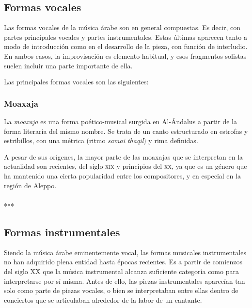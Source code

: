 \subsection{Formas vocales}

    Las formas vocales de la música árabe son en general compuestas. Es decir, con partes principales vocales y partes instrumentales. Estas últimas aparecen tanto a modo de introducción como en el desarrollo de la pieza, con función de interludio. En ambos casos, la improvisación es elemento habitual, y esos fragmentos solistas suelen incluir una parte importante de ella.

    Las principales formas vocales son las siguientes:

    \subsubsection{Moaxaja}

    La \emph{moaxaja} es una forma poético-musical surgida en Al-Ándalus a partir de la forma literaria del mismo nombre. Se trata de un canto estructurado en estrofas y estribillos, con una métrica (ritmo \emph{samai thaqil}) y rima definidas. 

    A pesar de sus orígenes, la mayor parte de las moaxajas que se interpretan en la actualidad son recientes, del siglo \textsc{xix} y principios del \textsc{xx}, ya que es un género que ha mantenido una cierta popularidad entre los compositores, y en especial en la región de Aleppo.


    \subsubsection{}
    ***

\subsection{Formas instrumentales}

    Siendo la música árabe eminentemente vocal, las formas musicales instrumentales no han adquirido plena entidad hasta épocas recientes. Es a partir de comienzos del siglo \textsc{XX} que la música instrumental alcanza suficiente categoría como para interpretarse por sí misma. Antes de ello, las piezas instrumentales aparecían tan solo como parte de piezas vocales, o bien se interpretaban entre ellas dentro de conciertos que se articulaban alrededor de la labor de un cantante.

